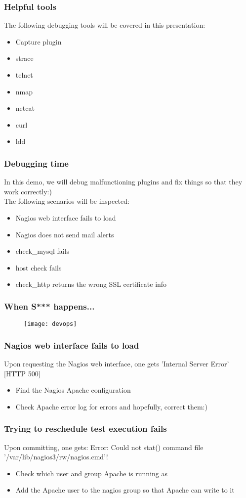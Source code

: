 \documentclass[aspectratio=169]{beamer}
\begin{document}
\begin{frame}
\frametitle{Helpful tools}
The following debugging tools will be covered in this presentation:
\begin{itemize}
\item Capture plugin
\item strace
\item telnet
\item nmap
\item netcat
\item curl
\item ldd
\end{itemize}
\end{frame}

\begin{frame}
\frametitle{Debugging time}
In this demo, we will debug malfunctioning plugins and fix things so that they work correctly:) \\
\bigskip
The following scenarios will be inspected:
\begin{itemize}
\item Nagios web interface fails to load
\item Nagios does not send mail alerts
\item check\_mysql fails
\item host check fails
\item check\_http returns the wrong SSL certificate info
\end{itemize}

\end{frame}

\begin{frame}
\frametitle{When S*** happens...}
\begin{figure}
\texttt{[image: devops]}
\end{figure}
\end{frame}

\begin{frame}
\frametitle{Nagios web interface fails to load}
Upon requesting the Nagios web interface, one gets 'Internal Server Error' [HTTP 500]
\bigskip
\begin{itemize}
\item Find the Nagios Apache configuration
\item Check Apache error log for errors and hopefully, correct them:)
\end{itemize}
\end{frame}


\begin{frame}
\frametitle{Trying to reschedule test execution fails}
Upon committing, one gets: Error: Could not stat() command file '/var/lib/nagios3/rw/nagios.cmd'!
\bigskip
\begin{itemize}
\item Check which user and group Apache is running as
\item Add the Apache user to the nagios group so that Apache can write to it
\end{itemize}
\end{frame}
\end{document}
